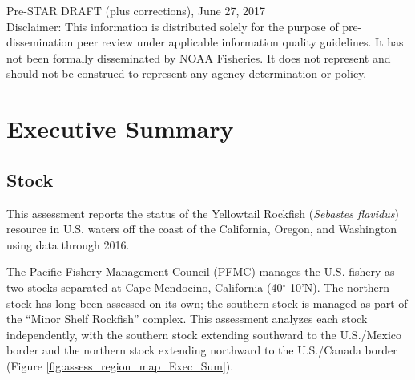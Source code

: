 \documentclass[12pt,]{article}
\begin{document}
\begin{center}
\vfill
Pre-STAR DRAFT (plus corrections), June 27, 2017\\
Disclaimer: This information is distributed solely for the purpose of pre-dissemination
peer review under applicable information quality guidelines. It has not been formally
disseminated by NOAA Fisheries. It does not represent and should not be construed to
represent any agency determination or policy. 

\vspace{.3cm}

\maketitle

\end{center}

{
\setcounter{tocdepth}{4}
\tableofcontents
}
\setlength{\parskip}{5mm plus1mm minus1mm} \pagebreak

 \renewcommand{\thefigure}{\alph{figure}}
\renewcommand{\thetable}{\alph{table}}

\section*{Executive Summary}\label{executive-summary}

\subsection*{Stock}\label{stock}

This assessment reports the status of the Yellowtail Rockfish
(\emph{Sebastes flavidus}) resource in U.S. waters off the coast of the
California, Oregon, and Washington using data through 2016.

The Pacific Fishery Management Council (PFMC) manages the U.S. fishery
as two stocks separated at Cape Mendocino, California (40\(^\circ\)
10'N). The northern stock has long been assessed on its own; the
southern stock is managed as part of the ``Minor Shelf Rockfish''
complex. This assessment analyzes each stock independently, with the
southern stock extending southward to the U.S./Mexico border and the
northern stock extending northward to the U.S./Canada border (Figure
\ref{fig:assess_region_map_Exec_Sum}).
\end{document}
